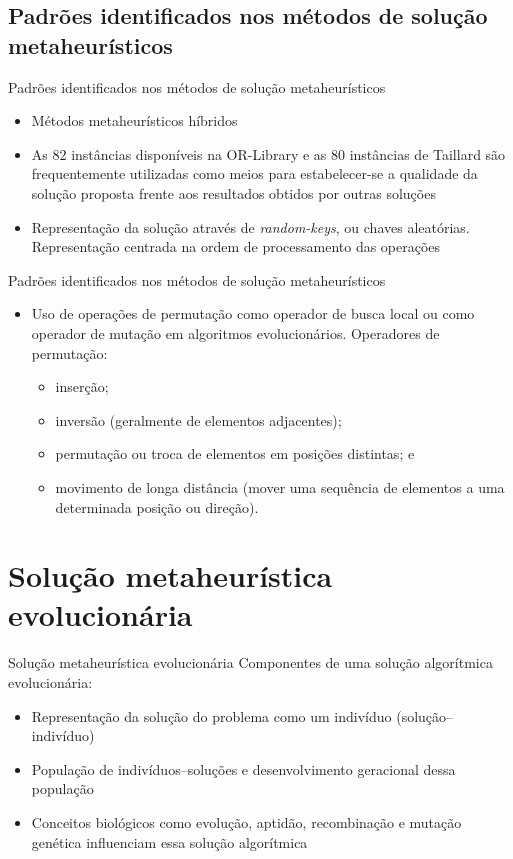 \documentclass{beamer}
\begin{document}
\subsection{Padrões identificados nos métodos de solução metaheurísticos}
\begin{frame}{Padrões identificados nos métodos de solução metaheurísticos}
\begin{itemize}
\item<1-> M\'{e}todos metaheur\'{i}sticos híbridos
\item<2-> As 82 inst\^{a}ncias dispon\'{i}veis na OR-Library \cite{OrLibrary} e as 80 inst\^{a}ncias de Taillard \cite{Taillard1993}
s\~{a}o frequentemente utilizadas como meios para estabelecer-se a qualidade da solu\c{c}\~{a}o proposta frente aos resultados obtidos
por outras solu\c{c}\~{o}es
\item<3-> Representação da solução através de \textit{random-keys}, ou chaves aleatórias. Representação centrada na ordem de processamento
das operações
\end{itemize}
\end{frame}
\begin{frame}{Padrões identificados nos métodos de solução metaheurísticos}
\begin{itemize}
\item<1-> Uso de opera\c{c}\~{o}es de permuta\c{c}\~{a}o como operador de busca local ou como operador de muta\c{c}\~{a}o em algoritmos
evolucionários. Operadores de permutação:
\begin{itemize}
\item<2-> inser\c{c}\~{a}o;
\item<3-> invers\~{a}o (geralmente de elementos adjacentes);
\item<4-> permuta\c{c}\~{a}o ou troca de elementos em posi\c{c}\~{o}es distintas; e
\item<5-> movimento de longa dist\^{a}ncia (mover uma sequ\^{e}ncia de elementos a uma determinada posi\c{c}\~{a}o ou dire\c{c}\~{a}o).
\end{itemize}
\end{itemize}
\end{frame}

\section{Solução metaheurística evolucionária}
\begin{frame}{Solução metaheurística evolucionária}
Componentes de uma solução algorítmica evolucionária:
\begin{itemize}
\item<1-> Representa\c{c}\~{a}o da solu\c{c}\~{a}o do problema como um indiv\'{i}duo (solu\c{c}\~{a}o--indiv\'{i}duo)
\item<2-> População de indivíduos--soluções e desenvolvimento geracional dessa população
\item<3-> Conceitos biol\'{o}gicos como evolu\c{c}\~{a}o, aptid\~{a}o, recombina\c{c}\~{a}o e muta\c{c}\~{a}o gen\'{e}tica influenciam
essa solução algorítmica
\end{itemize}
\end{frame}
\end{document}
